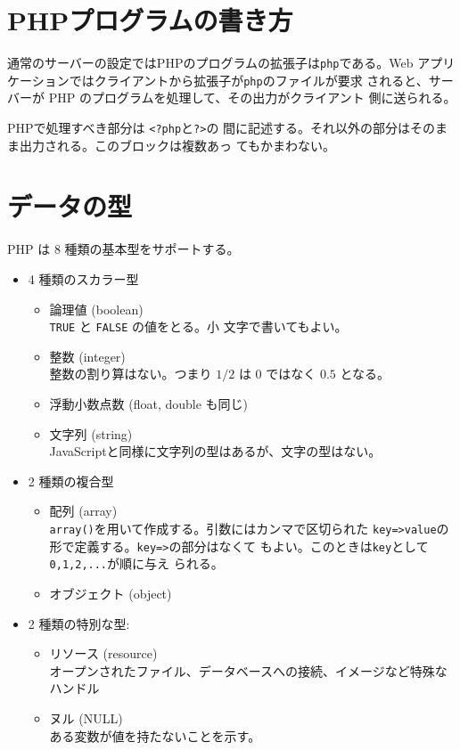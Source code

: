 \section{PHPプログラムの書き方}
通常のサーバーの設定ではPHPのプログラムの拡張子は\texttt{php}である。Web
アプリケーションではクライアントから拡張子が\texttt{php}のファイルが要求
されると、サーバーが PHP のプログラムを処理して、その出力がクライアント
側に送られる。

PHPで処理すべき部分は \texttt{<?php}と\texttt{?>}の
間に記述する。それ以外の部分はそのまま出力される。このブロックは複数あっ
てもかまわない。
\section{データの型}
PHP は 8 種類の基本型をサポートする。
\begin{itemize}
 \item 4 種類のスカラー型
 \begin{itemize}
  \item 論理値 (boolean)\\\texttt{TRUE} と \texttt{FALSE} の値をとる。小
	文字で書いてもよい。
  \item 整数 (integer)\\整数の割り算はない。つまり $1/2$ は $0$ ではなく
	$0.5$ となる。
  \item 浮動小数点数 (float, double も同じ)
  \item 文字列 (string)\\
JavaScriptと同様に文字列の型はあるが、文字の型はない。
 \end{itemize}
 \item 2 種類の複合型
 \begin{itemize}
  \item 配列 (array)\\
\texttt{array()}を用いて作成する。引数にはカンマで区切られた
	\texttt{key=>value}の形で定義する。\texttt{key=>}の部分はなくて
	もよい。このときは\texttt{key}として\texttt{0,1,2,...}が順に与え
	られる。
  \item オブジェクト (object)
 \end{itemize}
 \item 2 種類の特別な型:
\begin{itemize}
 \item リソース (resource)\\
オープンされたファイル、データベースへの接続、イメージなど特殊なハンドル
       
 \item ヌル (NULL)\\
ある変数が値を持たないことを示す。
\end{itemize}
\end{itemize}
